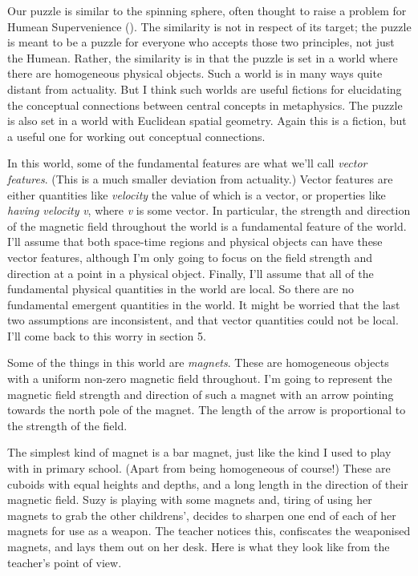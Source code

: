 \documentclass[
  11pt,
  letterpaper,
  DIV=11,
  numbers=noendperiod,
  twoside]{scrartcl}
\begin{document}
Our puzzle is similar to the spinning sphere, often thought to raise a
problem for Humean Supervenience (). The similarity is not in respect of its target; the puzzle is
meant to be a puzzle for everyone who accepts those two principles, not
just the Humean. Rather, the similarity is in that the puzzle is set in
a world where there are homogeneous physical objects. Such a world is in
many ways quite distant from actuality. But I think such worlds are
useful fictions for elucidating the conceptual connections between
central concepts in metaphysics. The puzzle is also set in a world with
Euclidean spatial geometry. Again this is a fiction, but a useful one
for working out conceptual connections.

In this world, some of the fundamental features are what we'll call
\emph{vector features}. (This is a much smaller deviation from
actuality.) Vector features are either quantities like \emph{velocity}
the value of which is a vector, or properties like \emph{having
velocity} \emph{v}, where \emph{v} is some vector. In particular, the
strength and direction of the magnetic field throughout the world is a
fundamental feature of the world. I'll assume that both space-time
regions and physical objects can have these vector features, although
I'm only going to focus on the field strength and direction at a point
in a physical object. Finally, I'll assume that all of the fundamental
physical quantities in the world are local. So there are no fundamental
emergent quantities in the world. It might be worried that the last two
assumptions are inconsistent, and that vector quantities could not be
local. I'll come back to this worry in section 5.

Some of the things in this world are \emph{magnets}. These are
homogeneous objects with a uniform non-zero magnetic field throughout.
I'm going to represent the magnetic field strength and direction of such
a magnet with an arrow pointing towards the north pole of the magnet.
The length of the arrow is proportional to the strength of the field.

The simplest kind of magnet is a bar magnet, just like the kind I used
to play with in primary school. (Apart from being homogeneous of
course!) These are cuboids with equal heights and depths, and a long
length in the direction of their magnetic field. Suzy is playing with
some magnets and, tiring of using her magnets to grab the other
childrens', decides to sharpen one end of each of her magnets for use as
a weapon. The teacher notices this, confiscates the weaponised magnets,
and lays them out on her desk. Here is what they look like from the
teacher's point of view.
\end{document}
